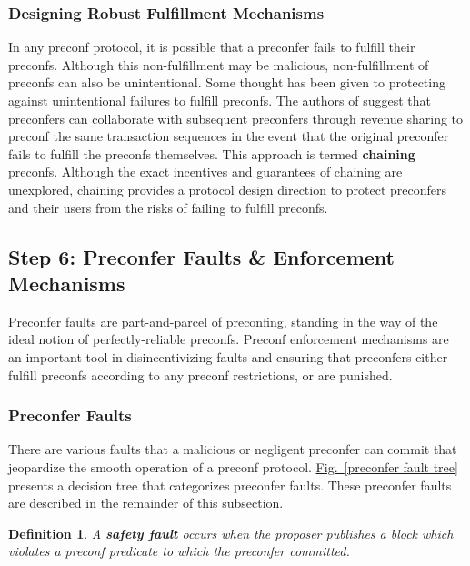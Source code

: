 \documentclass[a4paper]{article}
\theoremstyle{boldstyle}
\newtheorem{definitionx}{Definition}
\newenvironment{definition}
  {\begin{defopenboxq}\begin{definitionx}}
  {\end{definitionx}\end{defopenboxq}}
\begin{document}
\subsubsection{Designing Robust Fulfillment Mechanisms}\label{robust_delivery}

    In any preconf protocol, it is possible that a preconfer fails to fulfill their preconfs. Although this non-fulfillment may be malicious, non-fulfillment of preconfs can also be unintentional. Some thought has been given to protecting against unintentional failures to fulfill preconfs. The authors of \cite{W:AvoidingAccidentalLivenessFaultsforBasedPreconfs} suggest that preconfers can collaborate with subsequent preconfers through revenue sharing to preconf the same transaction sequences in the event that the original preconfer fails to fulfill the preconfs themselves. This approach is termed \textbf{chaining} preconfs. Although the exact incentives and guarantees of chaining are unexplored, chaining provides a protocol design direction to protect preconfers and their users from the risks of failing to fulfill preconfs. 
     
    
\subsection{Step 6: Preconfer Faults \& Enforcement Mechanisms} \label{preconfer_punishment}    


    Preconfer faults are part-and-parcel of preconfing, standing in the way of the ideal notion of perfectly-reliable preconfs. Preconf enforcement mechanisms are an important tool in disincentivizing faults and ensuring that preconfers either fulfill preconfs according to any preconf restrictions, or are punished. 
    
    \subsubsection{Preconfer Faults}\label{preconfer_faults_and_punishing_conditions}
    There are various faults that a malicious or negligent preconfer can commit that jeopardize the smooth operation of a preconf protocol. \hyperref[preconfer fault tree]{Fig.~\ref{preconfer fault tree}} presents a decision tree that categorizes preconfer faults. These preconfer faults are described in the remainder of this subsection. 

        \begin{definition}
            A \textbf{safety fault} occurs when the proposer publishes a block which violates a preconf predicate to which the preconfer committed.
        \end{definition}
        
\end{document}
